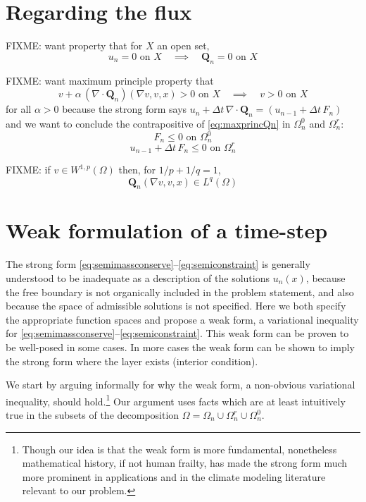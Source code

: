 \documentclass[final,leqno,onefignum,onetabnum]{siamltex1213bueler}
\newcommand\bQ{\mathbf{Q}}
\newcommand{\Div}{\nabla\cdot}
\renewcommand{\grad}{\nabla}
\begin{document}
\section{Regarding the flux}

FIXME:  want property that for $X$ an open set,
\begin{equation}
u_n=0 \text{ on } X \quad \implies \quad \bQ_n=0 \text{ on } X  \label{eq:vanishingQn}
\end{equation}

FIXME:  want maximum principle property that
\begin{equation}
v + \alpha\, (\Div \bQ_n)(\grad v,v,x) > 0 \text{ on } X \quad \implies \quad v > 0 \text{ on } X  \label{eq:maxprincQn}
\end{equation}
for all $\alpha>0$ because the strong form says $u_n + \Delta t\, \Div \bQ_n = (u_{n-1} + \Delta t\, F_n)$ and we want to conclude the contrapositive of \eqref{eq:maxprincQn} in $\Omega_n^0$ and $\Omega_n^r$:
\begin{equation}
F_n \le 0  \text{ on } \Omega_n^0  \label{eq:inequalityonzero}
\end{equation}
\begin{equation}
u_{n-1} + \Delta t\, F_n \le 0  \text{ on } \Omega_n^r  \label{eq:inequalityonretreat}
\end{equation}

FIXME: if $v \in W^{1,p}(\Omega)$ then, for $1/p + 1/q = 1$,
    $$\bQ_n(\grad v,v,x) \in L^q(\Omega)$$ 

\section{Weak formulation of a time-step}  The strong form \eqref{eq:semimassconserve}--\eqref{eq:semiconstraint} is generally understood to be inadequate as a description of the solutions $u_n(x)$, because the free boundary is not organically included in the problem statement, and also because the space of admissible solutions is not specified.  Here we both specify the appropriate function spaces and propose a weak form, a variational inequality \cite{Friedman,KinderlehrerStampacchia} for \eqref{eq:semimassconserve}--\eqref{eq:semiconstraint}.  This weak form can be proven to be well-posed in some cases.  In more cases the weak form can be shown to imply the strong form where the layer exists (interior condition).

We start by arguing informally for why the weak form, a non-obvious variational inequality, should hold.\footnote{Though our idea is that the weak form is more fundamental, nonetheless mathematical history, if not human frailty, has made the strong form much more prominent in applications and in the climate modeling literature relevant to our problem.}  Our argument uses facts which are at least intuitively true in the subsets of the decomposition $\Omega = \Omega_n \cup \Omega_n^r \cup \Omega_n^0$.
\end{document}
